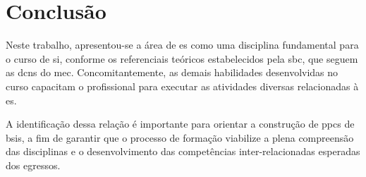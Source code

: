 \documentclass[12pt]{article}
\begin{document}
\section{Conclusão}%
\label{sec:conclusao}

Neste trabalho, apresentou-se a área de \gls{es} como uma disciplina fundamental para o curso de \gls{si}, conforme os referenciais teóricos estabelecidos pela \gls{sbc}, que seguem as \glspl{dcn} do \gls{mec}.
Concomitantemente, as demais habilidades desenvolvidas no curso capacitam o profissional para executar as atividades diversas relacionadas à \gls{es}.

A identificação dessa relação é importante para orientar a construção de \glspl{ppc} de \glspl{bsi}, a fim de garantir que o processo de formação viabilize a plena compreensão das disciplinas e o desenvolvimento das competências inter-relacionadas esperadas dos egressos.

\printbibliography{}
\end{document}
